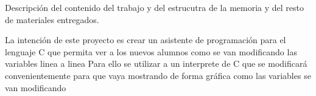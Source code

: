 
Descripción del contenido del trabajo y del estrucutra de la memoria y del resto de materiales entregados.

La  intención  de  este  proyecto  es  crear  un  asistente  de  programación para  el lenguaje C que permita ver a los nuevos alumnos como se van modificando las variables linea a linea
Para ello se utilizar a un interprete de C que se modificará convenientemente para que vaya mostrando de forma gráfica como las variables se van modificando